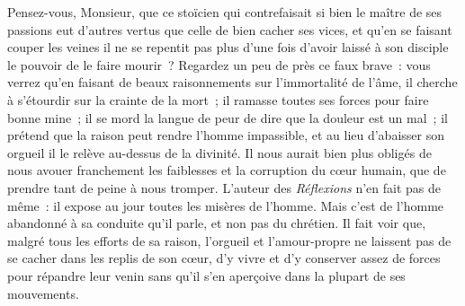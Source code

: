 \documentclass[french,twoside]{book} %
\begin{document}
Pensez-vous, Monsieur, que ce stoïcien qui contrefaisait si bien le maître de ses passions eut d’autres vertus que celle de bien cacher ses vices, et qu’en se faisant couper les veines il ne se repentit pas plus d’une fois d’avoir laissé à son disciple le pouvoir de le faire mourir ? Regardez un peu de près ce faux brave : vous verrez qu’en faisant de beaux raisonnements sur l’immortalité de l’âme, il cherche à s’étourdir sur la crainte de la mort ; il ramasse toutes ses forces pour faire bonne mine ; il se mord la langue de peur de dire que la douleur est un mal ; il prétend que la raison peut rendre l’homme impassible, et au lieu d’abaisser son orgueil il le relève au-dessus de la divinité. Il nous aurait bien plus obligés de nous avouer franchement les faiblesses et la corruption du cœur humain, que de prendre tant de peine à nous tromper. L’auteur des {\itshape Réflexions} n’en fait pas de même : il expose au jour toutes les misères de l’homme. Mais c’est de l’homme abandonné à sa conduite qu’il parle, et non pas du chrétien. Il fait voir que, malgré tous les efforts de sa raison, l’orgueil et l’amour-propre ne laissent pas de se cacher dans les replis de son cœur, d’y vivre et d’y conserver assez de forces pour répandre leur venin sans qu’il s’en aperçoive dans la plupart de ses mouvements.\par
\end{document}
